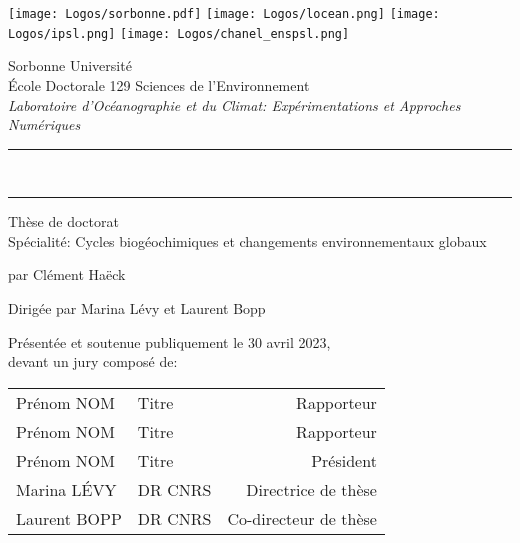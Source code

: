 

\begin{titlingpage}

\begin{center}
  \texttt{[image: Logos/sorbonne.pdf]}
  \hfill
  \texttt{[image: Logos/locean.png]}
  \hfill
  \texttt{[image: Logos/ipsl.png]}
  \hfill
  \texttt{[image: Logos/chanel\_enspsl.png]}

  \vspace{1cm}

  {\LARGE Sorbonne Université}\\[2ex]
  École Doctorale 129 Sciences de l'Environnement\\
  \emph{Laboratoire d'Océanographie et du Climat: Expérimentations et Approches Numériques}

  \vspace{3cm}

  \par\noindent\rule[0.7em]{\textwidth}{2pt}
  {\bfseries\Large \Title}\\
  \par\noindent\rule{\textwidth}{2pt}

  \vspace{3cm}

  Thèse de doctorat\\
  Spécialité: Cycles biogéochimiques et changements environnementaux globaux

  \vspace{1cm}

  {\normalsize par Clément Haëck}

  \vspace{1cm}

  Dirigée par Marina Lévy et Laurent Bopp

  \vspace{2cm}
\end{center}

\par\noindent Présentée et soutenue publiquement le 30 avril 2023,\\
devant un jury composé de:

\begin{center}
\begin{tabular}{llr<{\raggedleft}}
  Prénom NOM & Titre & Rapporteur \\
  Prénom NOM & Titre & Rapporteur \\
  Prénom NOM & Titre & Président \\
  Marina LÉVY & DR CNRS & Directrice de thèse \\
  Laurent BOPP & DR CNRS & Co-directeur de thèse \\
\end{tabular}
\end{center}

\end{titlingpage}
\restoregeometry

